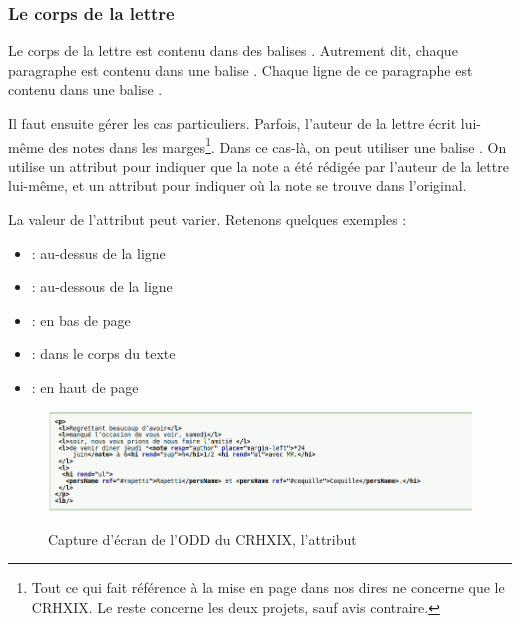 \subsubsection{Le corps de la lettre}

Le corps de la lettre est contenu dans des balises . Autrement dit, chaque paragraphe est contenu dans une balise . Chaque ligne de ce paragraphe est contenu dans une balise .

Il faut ensuite gérer les cas particuliers. Parfois, l'auteur de la lettre écrit lui-même des notes dans les marges\footnote{Tout ce qui fait référence à la mise en page dans nos dires ne concerne que le CRHXIX. Le reste concerne les deux projets, sauf avis contraire.}. Dans ce cas-là, on peut utiliser une balise . On utilise un attribut  pour indiquer que la note a été rédigée par l'auteur de la lettre lui-même, et un attribut  pour indiquer où la note se trouve dans l'original.

La valeur de l'attribut  peut varier. Retenons quelques exemples :
\begin{itemize}
    \item {} : au-dessus de la ligne
    \item {} : au-dessous de la ligne
    \item {} : en bas de page
    \item {} : dans le corps du texte
    \item {} : en haut de page
\end{itemize}

\begin{figure}[ht]
    \centering
    \caption{Capture d'écran de l'ODD du CRHXIX, l'attribut }
    \includegraphics[width=16cm]{images/place.png}
    \label{place}
\end{figure}

